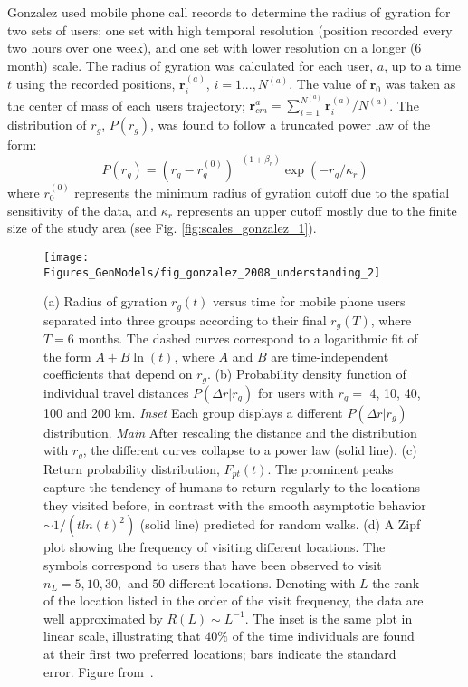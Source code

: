 Gonzalez \et\cite{gonzalez_2008_understanding} used mobile phone call records to determine the radius of gyration for two sets of users; one set with high temporal resolution (position recorded every two hours over one week), and one set with lower resolution on a longer (6 month) scale. The radius of gyration was calculated for each user, $a$, up to a time $t$  using the recorded positions, $\mathbf{r}_i^{(a)}$, $i=1...,N^{(a)}$. The value of $\mathbf{r}_0$ was taken as the center of mass of each users trajectory; $\mathbf{r}_{cm}^{a} = \sum_{i=1}^{N^{(a)}} \mathbf{r}_i^{(a)}/ N^{(a)}$.
The distribution of $r_g$, $P(r_g)$, was found to follow a truncated power law of the form:
%
\begin{equation}\label{eq:prg}
P(r_g) = (r_g - r_g^{(0)})^{-(1+\beta_r)} \exp{(- r_g / \kappa_r)}
\end{equation}
%
where $r^{(0)}_0$ represents the minimum radius of gyration cutoff due to the spatial sensitivity of the data, and $\kappa_r$ represents an upper cutoff mostly due to the finite size of the study area (see Fig. \ref{fig:scales_gonzalez_1}).

\begin{figure}[t!]
\centering
\texttt{[image: Figures\_GenModels/fig\_gonzalez\_2008\_understanding\_2]}
\caption{(a) Radius of gyration $r_g(t)$ versus time for mobile phone users separated into three groups according to their final $r_g(T)$, where $T=6$ months. 
The dashed curves correspond to a logarithmic fit of the form $A + B \ln(t)$, where $A$ and $B$ are time-independent coefficients that depend on $r_g$. 
%
(b) Probability density function of individual travel distances $P(\Delta r | r_g)$ for users with $r_g =$ 4, 10, 40, 100 and 200 km. {\it Inset} Each group displays a different $P(\Delta r | r_g)$ distribution. {\it Main} After rescaling the distance and the distribution with $r_g$, the different curves collapse to a power law (solid line).
%
(c) Return probability distribution, $F_{pt}(t)$. The prominent peaks capture the tendency of humans to return regularly to the locations they visited before, in contrast with the smooth asymptotic behavior $\sim 1/(t ln(t)^2)$ (solid line) predicted for random walks. 
%
(d) A Zipf plot showing the frequency of visiting different locations. The symbols correspond to users that have been observed to visit $n_L = 5, 10, 30,$ and $50$ different locations. Denoting with $L$ the rank of the location listed in the order of the visit frequency, the data are well approximated by $R(L) \sim L^{-1}$. The inset is the same plot in linear scale, illustrating that $40\%$ of the time individuals are found at their first two preferred locations; bars indicate the standard error. Figure from~\cite{gonzalez_2008_understanding}.}
\label{fig:scales_gonzalez_2}
\end{figure}

